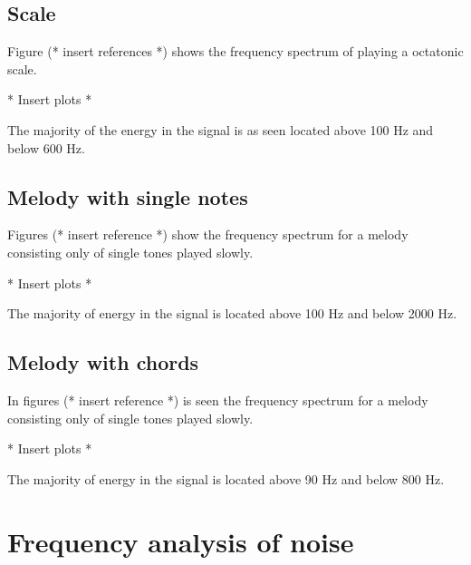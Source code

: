 \subsection{Scale}
Figure (* insert references *) shows the frequency spectrum of playing a octatonic scale.
\begin{center}
* Insert plots *
\end{center}

The majority of the energy in the signal is as seen located above 100 Hz and below 600 Hz.

\subsection{Melody with single notes}
Figures (* insert reference *) show the frequency spectrum for a melody consisting only of single tones played slowly.
\begin{center}
* Insert plots *
\end{center}

The majority of energy in the signal is located above 100 Hz and below 2000 Hz.

\subsection{Melody with chords}
In figures (* insert reference *) is seen the frequency spectrum for a melody consisting only of single tones played slowly.
\begin{center}
* Insert plots *
\end{center}

The majority of energy in the signal is located above 90 Hz and below 800 Hz.

\section{Frequency analysis of noise}